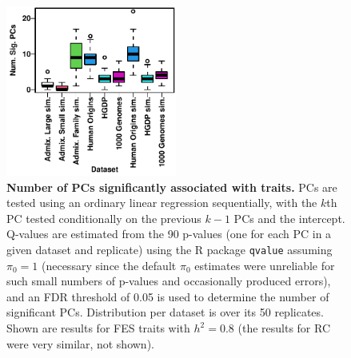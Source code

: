 \documentclass[11pt]{article}
\begin{document}
\begin{figure}[hp!]
  \centering
  \includegraphics[width=0.5\textwidth]{fes/pcs-num-sig.pdf}
  \caption{
    {\bf Number of PCs significantly associated with traits.}
    PCs are tested using an ordinary linear regression sequentially, with the $k$th PC tested conditionally on the previous $k-1$ PCs and the intercept.
    Q-values are estimated from the 90 p-values (one for each PC in a given dataset and replicate) using the R package \texttt{qvalue} assuming $\pi_0 = 1$ (necessary since the default $\pi_0$ estimates were unreliable for such small numbers of p-values and occasionally produced errors), and an FDR threshold of 0.05 is used to determine the number of significant PCs.
    Distribution per dataset is over its 50 replicates.
    Shown are results for FES traits with $h^2=0.8$ (the results for RC were very similar, not shown).
  }
  \label{fig:pcs-num-sig}
\end{figure}
\end{document}
